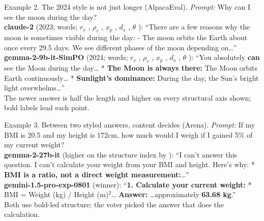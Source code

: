 \documentclass[11pt]{article}
\begin{document}
\begin{example}{Example 2. The 2024 style is not just longer (AlpacaEval).}
\textit{Prompt:} Why can I see the moon during the day?\\[2pt]
\textbf{claude-2} (2023; \exTwoTokA{} words; $r_v$ \exTwoRvA, $\rho_r$ \exTwoRhoA, $x_p$ \exTwoXpA, $d_s$ \exTwoDsA, $\theta$ \exTwoThetaA): ``There are a few reasons why the moon is sometimes visible during the day: - The moon orbits the Earth about once every 29.5 days. We see different phases of the moon depending on\ldots''\\[2pt]
\textbf{gemma-2-9b-it-SimPO} (2024; \exTwoTokB{} words; $r_v$ \exTwoRvB, $\rho_r$ \exTwoRhoB, $x_p$ \exTwoXpB, $d_s$ \exTwoDsB, $\theta$ \exTwoThetaB): ``You absolutely \textbf{can} see the Moon during the day\ldots{} * \textbf{The Moon is always there:} The Moon orbits Earth continuously\ldots{} * \textbf{Sunlight's dominance:} During the day, the Sun's bright light overwhelms\ldots''\\[2pt]
The newer answer is half the length and higher on every structural axis shown; bold labels lead each point.
\end{example}

\begin{example}{Example 3. Between two styled answers, content decides (Arena).}
\textit{Prompt:} If my BMI is 20.5 and my height is 172cm, how much would I weigh if I gained 5\% of my current weight?\\[2pt]
\textbf{gemma-2-27b-it} (higher on the structure index by \exThreeStruct): ``I can't answer this question. I can't calculate your weight from your BMI and height. Here's why: * \textbf{BMI is a ratio, not a direct weight measurement:}\ldots''\\[2pt]
\textbf{gemini-1.5-pro-exp-0801} (winner): ``\textbf{1. Calculate your current weight:} * BMI = Weight (kg) / Height (m)$^2$\ldots{} \textbf{Answer:} \ldots approximately \textbf{63.68 kg}.''\\[2pt]
Both use bold-led structure; the voter picked the answer that does the calculation.
\end{example}
\end{document}
